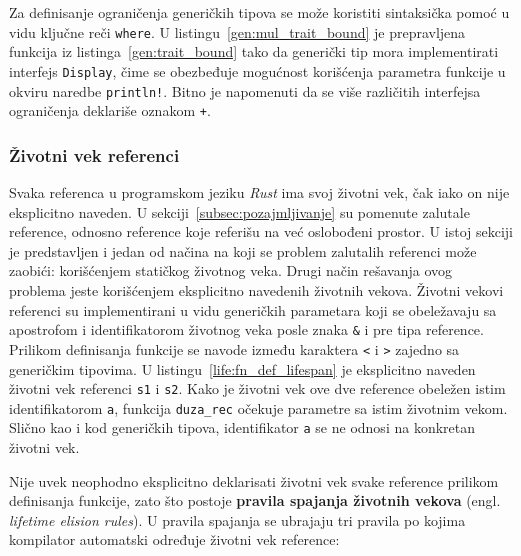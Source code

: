 \documentclass[12pt,oneside]{memoir}
\begin{document}


Za definisanje ograničenja generičkih tipova se može koristiti sintaksička pomoć u
vidu ključne reči \texttt{where}. U listingu~\ref{gen:mul_trait_bound} je prepravljena
funkcija iz listinga~\ref{gen:trait_bound} tako da generički tip mora implementirati
interfejs \texttt{Display}, čime se obezbeđuje mogućnost korišćenja parametra funkcije
u okviru naredbe \texttt{println!}. Bitno je napomenuti da se više različitih interfejsa
ograničenja deklariše oznakom \texttt{+}.




\subsubsection{Životni vek referenci}
Svaka referenca u programskom jeziku \emph{Rust} ima svoj životni vek, čak iako on nije
eksplicitno naveden. U sekciji~\ref{subsec:pozajmljivanje} su pomenute zalutale reference,
odnosno reference koje referišu na već oslobođeni prostor. U istoj sekciji je predstavljen
i jedan od načina na koji se problem zalutalih referenci može zaobići:
korišćenjem statičkog životnog veka. Drugi način rešavanja ovog problema jeste korišćenjem
eksplicitno navedenih životnih vekova.
Životni vekovi referenci su implementirani u vidu generičkih parametara
koji se obeležavaju sa apostrofom i identifikatorom životnog veka posle
znaka \texttt{\&} i pre tipa reference. Prilikom definisanja funkcije se navode između
karaktera \texttt{<} i \texttt{>} zajedno sa generičkim tipovima.
U listingu~\ref{life:fn_def_lifespan} je eksplicitno naveden životni vek referenci
\texttt{s1} i \texttt{s2}. Kako je životni vek ove dve reference obeležen istim
identifikatorom \texttt{a}, funkcija \texttt{duza\_rec} očekuje parametre sa istim životnim vekom.
Slično kao i kod generičkih tipova, identifikator \texttt{a} se ne odnosi
na konkretan životni vek.



Nije uvek neophodno eksplicitno deklarisati životni vek svake reference prilikom
definisanja funkcije, zato što
postoje \textbf{pravila spajanja životnih vekova} (engl. \emph{lifetime elision rules}).
U pravila spajanja se ubrajaju tri
pravila po kojima kompilator automatski određuje životni vek reference:
\end{document}
